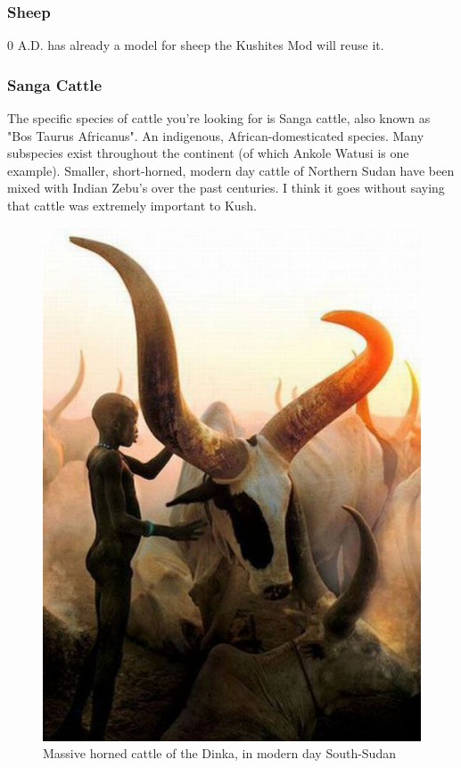 \documentclass[a4paper,12pt]{scrreprt}
\begin{document}
\subsubsection{Sheep}

0 A.D. has already a model for sheep the Kushites Mod will reuse it.

\subsubsection{Sanga Cattle}

The specific species of cattle you're looking for is Sanga cattle, also known as "Bos Taurus Africanus". An indigenous, African-domesticated species. Many subspecies exist throughout the continent (of which Ankole Watusi is one example). Smaller, short-horned, modern day cattle of Northern Sudan have been mixed with Indian Zebu's over the past centuries. I think it goes without saying that cattle was extremely important to Kush.\\

\begin{figure}[H]
	\centering
	\includegraphics[width=\textwidth]{img/corral/sanga_cattle_dinka}
	\caption{Massive horned cattle of the Dinka, in modern day South-Sudan}
\end{figure}
\end{document}

